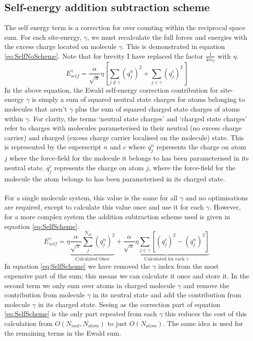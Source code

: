 \subsection{Self-energy addition subtraction scheme}
The self energy term is a correction for over counting within the reciprocal space sum. For each site-energy, $\gamma$, we must recalculate the full forces and energies with the excess charge located on molecule $\gamma$. This is demonstrated in equation \eqref{eq:SelfNoScheme}. Note that for brevity I have replaced the factor $\frac{1}{4 \pi \epsilon_0}$ with $\eta$.
\begin{equation}
  E_{self}^{\gamma} = \frac{\alpha}{\sqrt{\pi}} \eta \left[\sum_{j \not\in \gamma} \left(q^{n}_{j}\right)^2  + \sum_{j \in \gamma} \left(q^{c}_{j}\right)^2\right]
  \label{eq:SelfNoScheme}
\end{equation}
In the above equation, the Ewald self-energy correction contribution for site-energy $\gamma$ is simply a sum of squared neutral state charges for atoms belonging to molecules that aren't $\gamma$ plus the sum of squared charged state charges of atoms within $\gamma$. For clarity, the terms `neutral state charges' and `charged state charges' refer to charges with molecules parameterised in their neutral (no excess charge carrier) and charged (excess charge carrier localised on the molecule) state. This is represented by the superscript $n$ and $c$ where $q^{n}_{j}$ represents the charge on atom $j$ where the force-field for the molecule it belongs to has been parameterised in its neutral state. $q^{c}_{j}$ represents the charge on atom $j$, where the force-field for the molecule the atom belongs to has been parameterised in its charged state.
\\\\
For a single molecule system, this value is the same for all $\gamma$ and no optimisations are required, except to calculate this value once and use it for each $\gamma$. However, for a more complex system the addition subtraction scheme used is given in equation \eqref{eq:SelfScheme}.
\begin{equation}
  E_{self}^{\gamma} = \eta \underbrace{\frac{\alpha}{\sqrt{\pi}} \sum_{j}^{N_{at}}\left(q_{j}^{n}\right)^2}_{\text{Calculated Once}} + \underbrace{\frac{\alpha}{\sqrt{\pi}} \eta \sum_{j \in \gamma} \left[ (q^{c}_{j})^2 - (q^{n}_{j})^2 \right]}_{\text{Calculated for each $\gamma$}}
  \label{eq:SelfScheme}
\end{equation}
In equation \eqref{eq:SelfScheme} we have removed the $\gamma$ index from the most expensive part of the sum; this means we can calculate it once and store it. In the second term we only sum over atoms in charged molecule $\gamma$ and remove the contribution from molecule $\gamma$ in its neutral state and add the contribution from molecule $\gamma$ in its charged state. Seeing as the correction part of equation \eqref{eq:SelfScheme} is the only part repeated from each $\gamma$ this reduces the cost of this calculation from $O(N_{mol}, N_{atom})$ to just $O(N_{atom})$. The same idea is used for the remaining terms in the Ewald sum.
